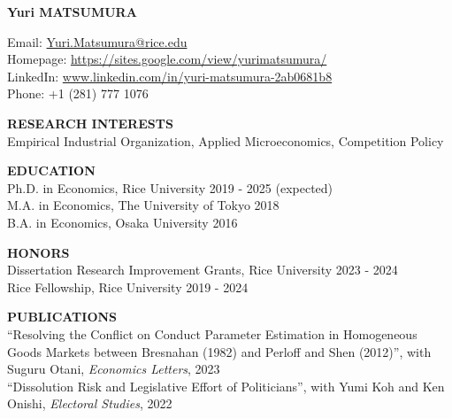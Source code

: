 \documentclass[10pt]{article}
\begin{document}
\begin{center}
    {\LARGE \textbf{Yuri MATSUMURA}} \\
\end{center}

\vspace{1mm}
Email: \href{mailto:Yuri.Matsumura@rice.edu}{Yuri.Matsumura@rice.edu} \\
Homepage: \href{https://sites.google.com/view/yurimatsumura/}{https://sites.google.com/view/yurimatsumura/} \\
LinkedIn: \href{https://www.linkedin.com/in/yuri-matsumura-2ab0681b8}{www.linkedin.com/in/yuri-matsumura-2ab0681b8} \\
Phone: +1 (281) 777 1076

\vspace{10pt}

\textbf{RESEARCH INTERESTS} \\
Empirical Industrial Organization, Applied Microeconomics, Competition Policy

\vspace{10pt}

\textbf{EDUCATION} \\
Ph.D. in Economics, Rice University \hfill 2019 - 2025 (expected) \\
M.A. in Economics, The University of Tokyo \hfill 2018 \\
B.A. in Economics, Osaka University \hfill 2016

\vspace{10pt}

\textbf{HONORS} \\
Dissertation Research Improvement Grants, Rice University \hfill 2023 - 2024 \\
Rice Fellowship, Rice University \hfill 2019 - 2024

\vspace{10pt}

\textbf{PUBLICATIONS} \\
“Resolving the Conflict on Conduct Parameter Estimation in Homogeneous Goods Markets between Bresnahan (1982) and Perloff and Shen (2012)”, with Suguru Otani, \textit{Economics Letters}, 2023 \\
“Dissolution Risk and Legislative Effort of Politicians”, with Yumi Koh and Ken Onishi, \textit{Electoral Studies}, 2022

\vspace{10pt}
\end{document}
